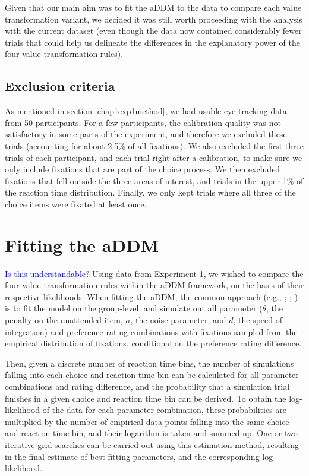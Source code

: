 \documentclass[11pt,a4paper]{article}
\newcommand{\AT}[1] {{\textcolor{blue}{#1}}}
\begin{document}
Given that our main aim was to fit the aDDM to the data to compare each value transformation variant, we decided it was still worth proceeding with the analysis with the current dataset (even though the data now contained considerably fewer trials that could help us delineate the differences in the explanatory power of the four value transformation rules). 

\subsection{Exclusion criteria}

As mentioned in section  \ref{chap1exp1method}, we had usable eye-tracking data from 50 participants. For a few participants, the calibration quality was not satisfactory in some parts of the experiment, and therefore we excluded these trials (accounting for about 2.5\% of all fixations). We also excluded the first three trials of each participant, and each trial right after a calibration, to make sure we only include fixations that are part of the choice process. We then excluded fixations that fell outside the three areas of interest, and trials in the upper 1\% of the reaction time distribution. Finally, we only kept trials where all three of the choice items were fixated at least once. 


\section{Fitting the aDDM}

\AT{Is this understandable?}
Using data from Experiment 1, we wished to compare the four value transformation rules within the aDDM framework, on the basis of their respective likelihoods. When fitting the aDDM, the common approach (e.g., ; ; ) is to fit the model on the group-level, and simulate out all parameter ($\theta$, the penalty on the unattended item, $\sigma$, the noise parameter, and $d$, the speed of integration) and preference rating combinations with fixations sampled from the empirical distribution of fixations, conditional on the preference rating difference. 

Then, given a discrete number of reaction time bins, the number of simulations falling into each choice and reaction time bin can be calculated for all parameter combinations and rating difference, and the probability that a simulation trial finishes in a given choice and reaction time bin can be derived. To obtain the log-likelihood of the data for each parameter combination, these probabilities are multiplied by the number of empirical data points falling into the same choice and reaction time bin, and their logarithm is taken and summed up. One or two iterative grid searches can be carried out using this estimation method, resulting in the final estimate of best fitting parameters, and the corresponding log-likelihood.
\end{document}

